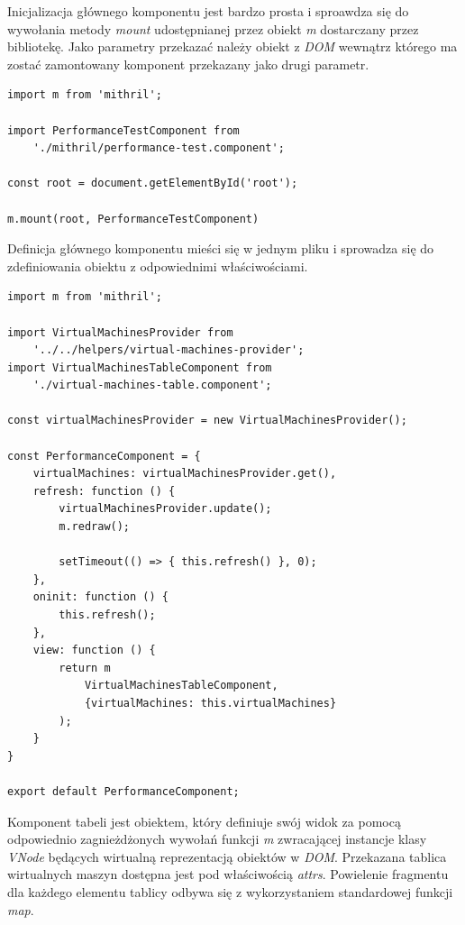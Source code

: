 \documentclass[polish, twoside, 12pt]{mwart}
\begin{document}
Inicjalizacja głównego komponentu jest bardzo prosta i sproawdza się do wywołania metody \emph{mount} udostępnianej przez obiekt \emph{m} dostarczany przez bibliotekę. Jako parametry przekazać należy obiekt z \emph{DOM} wewnątrz którego ma zostać zamontowany komponent przekazany jako drugi parametr.

\begin{lstlisting}[caption=Inicjalizacja głównego komponentu]
import m from 'mithril';

import PerformanceTestComponent from
    './mithril/performance-test.component';

const root = document.getElementById('root');

m.mount(root, PerformanceTestComponent)
\end{lstlisting}

Definicja głównego komponentu mieści się w jednym pliku i sprowadza się do zdefiniowania obiektu z odpowiednimi właściwościami.

\begin{lstlisting}[caption=Główny komponent]
import m from 'mithril';

import VirtualMachinesProvider from
    '../../helpers/virtual-machines-provider';
import VirtualMachinesTableComponent from
    './virtual-machines-table.component';

const virtualMachinesProvider = new VirtualMachinesProvider();

const PerformanceComponent = {
    virtualMachines: virtualMachinesProvider.get(),
    refresh: function () {
        virtualMachinesProvider.update();
        m.redraw();

        setTimeout(() => { this.refresh() }, 0);
    },
    oninit: function () {
        this.refresh();
    },
    view: function () {
        return m
            VirtualMachinesTableComponent,
            {virtualMachines: this.virtualMachines}
        );
    }
}

export default PerformanceComponent;
\end{lstlisting}

Komponent tabeli jest obiektem, który definiuje swój widok za pomocą odpowiednio zagnieżdżonych wywołań funkcji \emph{m} zwracającej instancje klasy \emph{VNode} będących wirtualną reprezentacją obiektów w \emph{DOM}. Przekazana tablica wirtualnych maszyn dostępna jest pod właściwością \emph{attrs}. Powielenie fragmentu dla każdego elementu tablicy odbywa się z wykorzystaniem standardowej funkcji \emph{map}.
\end{document}
